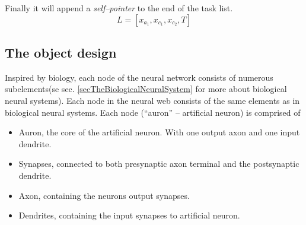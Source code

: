 Finally it will append a \emph{self--pointer} to the end of the task list.
\begin{equation}
	\nonumber
	L = [x_{a_1}, x_{c_1}, x_{c_2}, T ]
\end{equation}








	\subsection{The object design}
	\label{ssecTheObjectDesign}
		Inspired by biology, each node of the neural network consists of numerous subelements(se sec. \ref{secTheBiologicalNeuralSystem} for more about biological neural systems). 
		Each node in the neural web consists of the same elements as in biological neural systems. 
		Each node (``auron'' -- artificial neuron) is comprised of 
		\begin{itemize}
			\item Auron, the core of the artificial neuron. With one output axon and one input dendrite.
			\item Synapses, connected to both presynaptic axon terminal and the postsynaptic dendrite.
			\item Axon, containing the neurons output synapses.%
			\item Dendrites, containing the input synapses to artificial neuron.
		\end{itemize}
		


